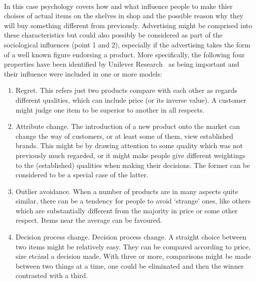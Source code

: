 \\
In this case psychology covers how and what influence people to make thier choises of actual items on the shelves in
shop and the possible reason why they will buy something different from previously.
Advertising might be comprised into these characteristics but could also possibly be considered as part of the sociological
influences (point 1 and 2), especially if the advertising takes the form of a well known figure endorsing a product.
More specifically, the following four properties have been identified by Unilever Research~\cite{patel} as being important and their influence were included in one or more models:

\begin{enumerate}
	\item Regret.
	This refers just two products compare with each other as regards different qualities, which can include price (or its inverse value).
	A customer might judge one item to be superior to another in all respects.
	\item Attribute change.
	The introduction of a new product onto the market can change the way of customers, or at least some of them, view established brands.
	This might be by drawing attention to some quality which was not previously much regarded, or it might make people give different
	weightings to the (established) qualities when making their decisions. The former can be considered to be a special case of the latter.
	\item Outlier avoidance.
	When a number of products are in many aspects quite similar, there can be a tendency for people to avoid ‘strange’ ones,
	like others which are substantially different from the majority in price or some other respect.
	Items near the average can be favoured.
	\item Decision process change.
	Decision process change.
	A straight choice between two items might be relatively easy.
	They can be compared according to price, size etc\. and a decision made. With three or more,
	comparisons might be made between two things at a time, one could be eliminated and then the winner contrasted with a third.
\end{enumerate}
